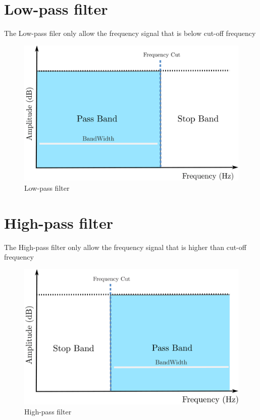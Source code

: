 \section{Low-pass filter}
\hspace{1.5cm}The Low-pass filer only allow the frequency signal that is below  cut-off frequency
\begin{figure}[ht]
	\centering
	\includegraphics[scale = 0.14]{chapter3/lowpass.pdf}
	\caption{Low-pass filter}
\end{figure}

\section{High-pass filter}
\hspace{1.5cm}The High-pass filter only allow the frequency signal that is higher than cut-off frequency
\begin{figure}[ht]
	\centering
	\includegraphics[scale = 0.14]{chapter3/highpass.pdf}
	\caption{High-pass filter}
\end{figure}


